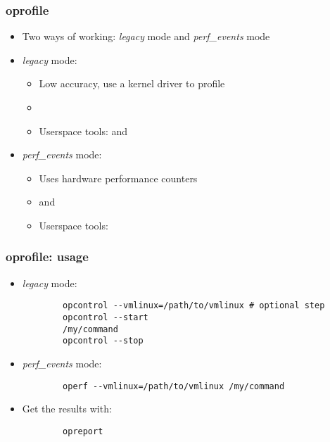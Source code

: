 \begin{frame}
\frametitle{oprofile}
\begin{itemize}
	\item Two ways of working: {\em legacy} mode and {\em
              perf\_events} mode
	\item {\em legacy} mode:
	\begin{itemize}
		\item Low accuracy, use a kernel driver to profile
		\item {}
		\item Userspace tools:  and 
	\end{itemize}
	\item {\em perf\_events} mode:
	\begin{itemize}
		\item Uses hardware performance counters
		\item {} and 
		\item Userspace tools: 
	\end{itemize}
\end{itemize}
\end{frame}

\begin{frame}[fragile]
\frametitle{oprofile: usage}
\begin{itemize}
	\item {\em legacy} mode:
	\begin{block}{}
	\begin{verbatim}
		opcontrol --vmlinux=/path/to/vmlinux # optional step
		opcontrol --start
		/my/command
		opcontrol --stop
	\end{verbatim}
	\end{block}
	\item {\em perf\_events} mode:
	\begin{block}{}
	\begin{verbatim}
		operf --vmlinux=/path/to/vmlinux /my/command
	\end{verbatim}
	\end{block}
	\item Get the results with:
	\begin{block}{}
	\begin{verbatim}
		opreport
	\end{verbatim}
	\end{block}
\end{itemize}
\end{frame}


